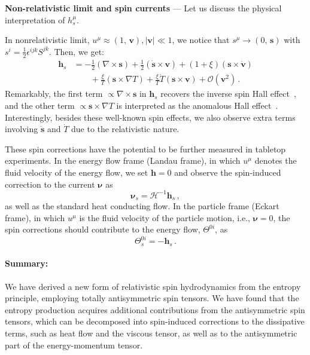 \documentclass[prl,superscriptaddress,twocolumn,
  showpacs,preprintnumbers,amsmath,amssymb]{revtex4-1}
\newcommand{\bs}{{\bm s}}
\newcommand{\bv}{{\bm v}}
\begin{document}
\noindent
\textbf{Non-relativistic limit and spin currents}
---
Let us discuss the physical interpretation of $h_{s}^{\mu}$.

In nonrelativistic limit, $u^{\mu}\approx(1,\,\bv), |\bv|\ll1$, we notice that $s^{\mu}\rightarrow(0,\,\bs)$ with $s^i=\frac{1}{2}\epsilon^{ijk}S^{jk}$.  Then, we get:
\begin{equation}
  \begin{split}
  \boldsymbol{h}_{s} & = -\frac{1}{2}(\nabla\times\bs)  + \frac{1}{2}(\dot{\bs} \times \bv) + (1+\xi)(\bs \times  \dot{\bv}) \\
  &\qquad +\frac{\xi}{T}(\bs \times \nabla T) + \frac{\xi}{T}\dot{T}(\bs \times \bv) + \mathcal{O}(\bv^2)\,.
  \end{split}
 \label{eq:heat_flow_01-1}
\end{equation}
Remarkably, the first term $\propto \nabla\times\boldsymbol{s}$ in $\boldsymbol{h}_s$ recovers the inverse spin Hall effect~\cite{sinova2015spin}, and the other term $\propto \boldsymbol{s}\times\nabla T$ is interpreted as the anomalous Hall effect~\cite{nagaosa2010anomalous}.
Interestingly, besides these well-known spin effects, we also observe extra terms involving $\dot{\bm s}$ and $\dot{T}$ due to the relativistic nature.

These spin corrections have the potential to be further measured in tabletop experiments.
In the energy flow frame (Landau frame), in which $u^\mu$ denotes the fluid velocity of the energy flow, we set $\boldsymbol{h}=0$ and observe the spin-induced correction to the current $\boldsymbol{\nu}$ as
\begin{equation}
  \boldsymbol{\nu}_s = \mathcal{H}^{-1}\boldsymbol{h}_{s}\,,
\end{equation}
as well as the standard heat conducting flow.
In the particle frame (Eckart frame), in which $u^\mu$ is the fluid velocity of the particle motion, i.e., $\boldsymbol{\nu}=0$, the spin corrections should contribute to the energy flow, $\Theta^{0i}$, as
\begin{equation}
  \Theta^{0i}_s = -\boldsymbol{h}_{s}\,.
\end{equation}
\vspace{0.5em}



\paragraph*{Summary:}

We have derived a new form of relativistic spin hydrodynamics from the entropy principle, employing totally antisymmetric spin tensors.  We have found that the entropy production acquires additional contributions from the antisymmetric spin tensors, which can be decomposed into spin-induced corrections to the dissipative terms, such as heat flow and the viscous tensor, as well as to the antisymmetric part of the energy-momentum tensor.
\end{document}
